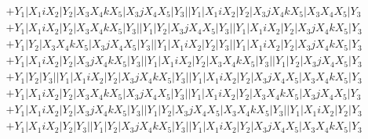 \documentclass{article}[12pt]
\begin{document}
\begin{align*}
 & +Y_1|X_1iX_2|Y_2|X_3X_4kX_5|X_3jX_4X_5|Y_3||Y_1|X_1iX_2|Y_2|X_3jX_4kX_5|X_3X_4X_5|Y_3\\ 
 & +Y_1|X_1iX_2|Y_2|X_3X_4kX_5|Y_3||Y_1|Y_2|X_3jX_4X_5|Y_3||Y_1|X_1iX_2|Y_2|X_3jX_4kX_5|Y_3\\ 
 & +Y_1|Y_2|X_3X_4kX_5|X_3jX_4X_5|Y_3||Y_1|X_1iX_2|Y_2|Y_3||Y_1|X_1iX_2|Y_2|X_3jX_4kX_5|Y_3\\ 
 & +Y_1|X_1iX_2|Y_2|X_3jX_4kX_5|Y_3||Y_1|X_1iX_2|Y_2|X_3X_4kX_5|Y_3||Y_1|Y_2|X_3jX_4X_5|Y_3\\ 
 & +Y_1|Y_2|Y_3||Y_1|X_1iX_2|Y_2|X_3jX_4kX_5|Y_3||Y_1|X_1iX_2|Y_2|X_3jX_4X_5|X_3X_4kX_5|Y_3\\ 
 & +Y_1|X_1iX_2|Y_2|X_3X_4kX_5|X_3jX_4X_5|Y_3||Y_1|X_1iX_2|Y_2|X_3X_4kX_5|X_3jX_4X_5|Y_3\\ 
 & +Y_1|X_1iX_2|Y_2|X_3jX_4kX_5|Y_3||Y_1|Y_2|X_3jX_4X_5|X_3X_4kX_5|Y_3||Y_1|X_1iX_2|Y_2|Y_3\\ 
 & +Y_1|X_1iX_2|Y_2|Y_3||Y_1|Y_2|X_3jX_4kX_5|Y_3||Y_1|X_1iX_2|Y_2|X_3jX_4X_5|X_3X_4kX_5|Y_3\end{align*}
\end{document}

